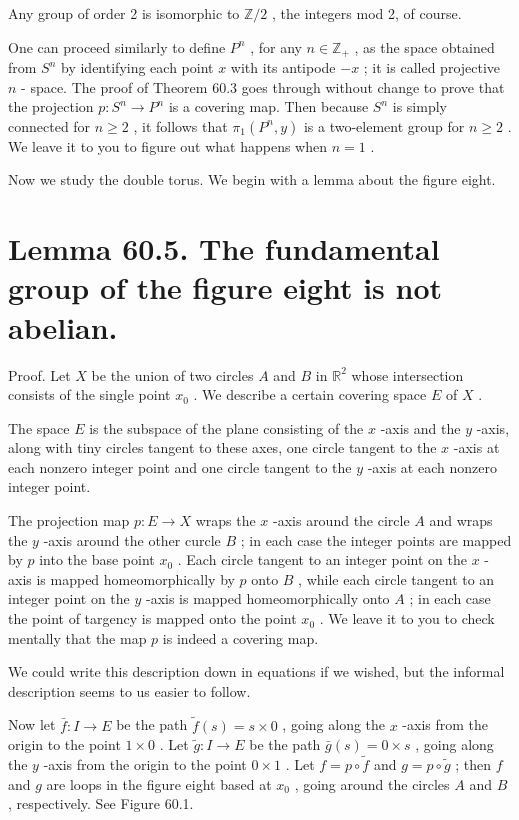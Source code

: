 Any group of order 2 is isomorphic to \(\mathbb{Z}/2\) , the integers mod 2, of course.

One can proceed similarly to define \({P}^{n}\) , for any \(n \in  {\mathbb{Z}}_{ + }\) , as the space obtained from \({S}^{n}\) by identifying each point \(x\) with its antipode \(- x\) ; it is called projective \(n\) - space. The proof of Theorem 60.3 goes through without change to prove that the projection \(p : {S}^{n} \rightarrow  {P}^{n}\) is a covering map. Then because \({S}^{n}\) is simply connected for \(n \geq  2\) , it follows that \({\pi }_{1}\left( {{P}^{n},y}\right)\) is a two-element group for \(n \geq  2\) . We leave it to you to figure out what happens when \(n = 1\) .

Now we study the double torus. We begin with a lemma about the figure eight.

\section*{Lemma 60.5. The fundamental group of the figure eight is not abelian.}

Proof. Let \(X\) be the union of two circles \(A\) and \(B\) in \({\mathbb{R}}^{2}\) whose intersection consists of the single point \({x}_{0}\) . We describe a certain covering space \(E\) of \(X\) .

The space \(E\) is the subspace of the plane consisting of the \(x\) -axis and the \(y\) -axis, along with tiny circles tangent to these axes, one circle tangent to the \(x\) -axis at each nonzero integer point and one circle tangent to the \(y\) -axis at each nonzero integer point.

The projection map \(p : E \rightarrow  X\) wraps the \(x\) -axis around the circle \(A\) and wraps the \(y\) -axis around the other curcle \(B\) ; in each case the integer points are mapped by \(p\) into the base point \({x}_{0}\) . Each circle tangent to an integer point on the \(x\) -axis is mapped homeomorphically by \(p\) onto \(B\) , while each circle tangent to an integer point on the \(y\) -axis is mapped homeomorphically onto \(A\) ; in each case the point of targency is mapped onto the point \({x}_{0}\) . We leave it to you to check mentally that the map \(p\) is indeed a covering map.

We could write this description down in equations if we wished, but the informal description seems to us easier to follow.

Now let \(\bar{f} : I \rightarrow  E\) be the path \(\widetilde{f}\left( s\right)  = s \times  0\) , going along the \(x\) -axis from the origin to the point \(1 \times  0\) . Let \(\widetilde{g} : I \rightarrow  E\) be the path \(\bar{g}\left( s\right)  = 0 \times  s\) , going along the \(y\) -axis from the origin to the point \(0 \times  1\) . Let \(f = p \circ  \widetilde{f}\) and \(g = p \circ  \widetilde{g}\) ; then \(f\) and \(g\) are loops in the figure eight based at \({x}_{0}\) , going around the circles \(A\) and \(B\) , respectively. See Figure 60.1.

